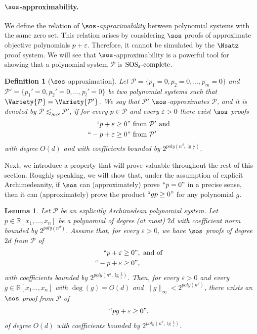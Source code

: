\documentclass[11pt]{article}
\newtheorem{lemma}[theorem]{Lemma}
\newtheorem{definition}[theorem]{Definition}
\newcommand{\SOSe}{\rm{SOS}_\varepsilon\text{-complete}}
\begin{document}
\paragraph{$\sos$-approximability.}
We define the relation of \emph{$\sos$-approximability} between polynomial systems with the same zero set. This relation arises by considering $\sos$ proofs of approximate objective polynomials $p + \varepsilon$. Therefore, it cannot be simulated by the $\Nsatz$ proof system. We will see that $\sos$-approximability is a powerful tool for showing that a polynomial system $\mathcal{P}$ is $\SOSe$.
\begin{definition}[$\sos$ approximation]\label{def:sos_approx}
     Let $\mathcal{P}=\{p_1 = 0,p_2=0, \dots, p_m=0\}$ and $\mathcal{P}'=\{p_1'=0, p_2'=0, \dots, p_l'=0\}$ be two polynomial systems such that $\Variety{\mathcal{P}} = \Variety{\mathcal{P}'}$. We say that \emph{$\mathcal{P}'$ $\sos$-approximates $\mathcal{P}$}, and it is denoted by $\mathcal{P} \lesssim_{SoS} \mathcal{P}'$, if for every $p \in \mathcal{P}$ and every $\varepsilon >0$ there exist $\sos$ proofs
    \begin{align}
      \begin{split}
    ``p + \varepsilon \geq 0&"  \text{ from }\mathcal{P}' \text{ and}\\
    ``-p + \varepsilon \geq 0&" \text{ from } \mathcal{P}'     
      \end{split}
    \end{align} 
    with degree $O(d)$ and with coefficients bounded by $2^{poly(n^d, \lg \frac{1}{\varepsilon})}$.
\end{definition}

Next, we introduce a property that will prove valuable throughout the rest of this section. Roughly speaking, we will show that, under the assumption of explicit Archimedeanity, if $\sos$ can (approximately) prove $``p=0"$ in a precise sense, then it can (approximately) prove the product $``gp \geq 0"$ for any polynomial $g$.

\begin{lemma}\label{lemma-pg-e}
    Let $\mathcal{P}$ be an explicitly Archimedean polynomial system. Let $p \in \mathbb{R}[x_1,\ldots,x_n]$ be a polynomial of degree (at most) $2d$ with coefficient norm bounded by $2^{poly(n^d)}$.
    Assume that, for every $\varepsilon>0$, we have $\sos$ proofs of degree $2d$ from $\mathcal{P}$ of
    \begin{align}
      \begin{split}
          ``p + \varepsilon &\geq 0", \text{ and of} \\
          ``-p + \varepsilon &\geq 0",      
      \end{split}
    \end{align} 
    with coefficients bounded by $2^{poly(n^d, \lg \frac{1}{\varepsilon})}$. Then, for every $\varepsilon>0$ and every $g \in \mathbb{R}[x_1 \dots, x_n]$ with $\deg(g) = O(d)$ and $\| g \|_{\infty} < 2^{poly(n^d)}$, there exists an $\sos$ proof from $\mathcal{P}$ of  
    $$`` pg + \varepsilon \geq 0",$$
    of degree $O(d)$ with coefficients bounded by $2^{poly(n^d, \lg \frac{1}{\varepsilon})}$.
\end{lemma}
\end{document}
